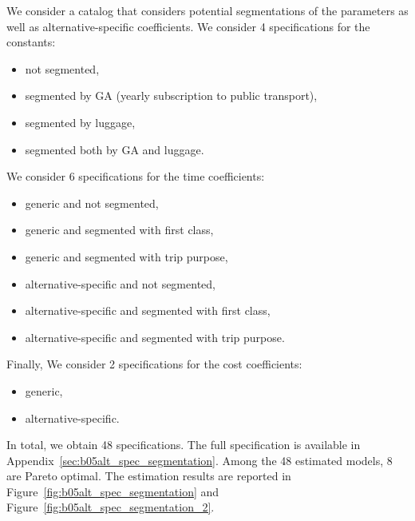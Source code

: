\documentclass[12pt,a4paper]{article}
\begin{document}
We consider a catalog that considers potential segmentations of the parameters as well as alternative-specific coefficients.
We consider 4 specifications for the constants:
\begin{itemize}
\item not segmented,
\item segmented by GA (yearly subscription to public transport),
\item segmented by luggage,
\item segmented both by GA and luggage.
\end{itemize}
We consider 6 specifications for the time coefficients:
\begin{itemize}
\item generic and not segmented,
\item generic and segmented with first class,
\item generic and segmented with trip purpose,
\item alternative-specific and not segmented,
\item alternative-specific and segmented with first class,
\item alternative-specific and segmented with trip purpose.
\end{itemize}
Finally, We consider 2 specifications for the cost coefficients:
\begin{itemize}
\item generic,
\item alternative-specific.
\end{itemize}
In total, we obtain 48 specifications. 
The
full specification is available in
Appendix~\ref{sec:b05alt_spec_segmentation}. Among the 48 estimated models, 8 are Pareto optimal. The estimation results are reported in Figure~\vref{fig:b05alt_spec_segmentation} and Figure~\vref{fig:b05alt_spec_segmentation_2}. 
\end{document}
